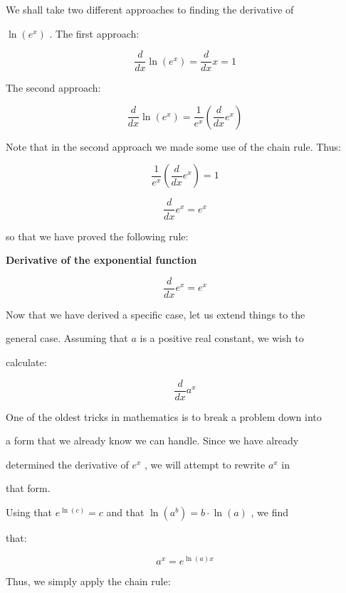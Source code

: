 We shall take two different approaches to finding the derivative of

$\ln(e^x)$ . The first approach:



$$\frac{d}{dx}\ln(e^x)=\frac{d}{dx}x=1$$



The second approach:



$$\frac{d}{dx}\ln(e^x)=\frac{1}{e^x}\left(\frac{d}{dx}e^x\right)$$



Note that in the second approach we made some use of the chain rule. Thus:



$$\frac{1}{e^x}\left(\frac{d}{dx}e^x\right)=1$$



$$\frac{d}{dx}e^x=e^x$$



so that we have proved the following rule:



\textbf{Derivative of the exponential function}

 $$\frac{d}{dx}e^x=e^x$$               



Now that we have derived a specific case, let us extend things to the

general case. Assuming that $a$ is a positive real constant, we wish to

calculate:



$$\frac{d}{dx}a^x$$



One of the oldest tricks in mathematics is to break a problem down into

a form that we already know we can handle. Since we have already

determined the derivative of $e^x$ , we will attempt to rewrite $a^x$ in

that form.



Using that $e^{\ln(c)}=c$ and that $\ln(a^b)=b\cdot\ln(a)$ , we find

that:



$$a^x=e^{\ln(a)x}$$



Thus, we simply apply the chain rule:



